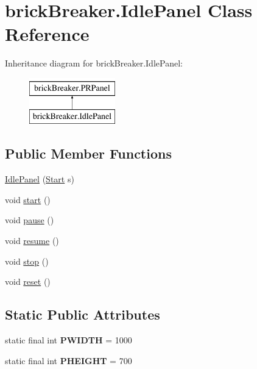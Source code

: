 \hypertarget{classbrick_breaker_1_1_idle_panel}{
\section{brickBreaker.IdlePanel Class Reference}
\label{classbrick_breaker_1_1_idle_panel}
}
Inheritance diagram for brickBreaker.IdlePanel:\begin{figure}[H]
\begin{center}
\leavevmode
\includegraphics[height=2cm]{classbrick_breaker_1_1_idle_panel}
\end{center}
\end{figure}
\subsection*{Public Member Functions}
\begin{DoxyCompactItemize}
\item 
\hyperlink{classbrick_breaker_1_1_idle_panel_ab4ba4ca56923da71a415ca965a07b0dd}{IdlePanel} (\hyperlink{classbrick_breaker_1_1_start}{Start} s)
\item 
void \hyperlink{classbrick_breaker_1_1_idle_panel_ad391091a78283ca2546e52f967d46ed6}{start} ()
\item 
void \hyperlink{classbrick_breaker_1_1_idle_panel_a42b96627662408932245a672b5fbfaf1}{pause} ()
\item 
void \hyperlink{classbrick_breaker_1_1_idle_panel_ab04b565d2e626077051cefb27772a98f}{resume} ()
\item 
void \hyperlink{classbrick_breaker_1_1_idle_panel_a2334ae977477929eeb82dbba53384360}{stop} ()
\item 
void \hyperlink{classbrick_breaker_1_1_idle_panel_a6d0829251befbc226224838015e9e46d}{reset} ()
\end{DoxyCompactItemize}
\subsection*{Static Public Attributes}
\begin{DoxyCompactItemize}
\item 
\hypertarget{classbrick_breaker_1_1_idle_panel_a58f042f33a11a790b7e7faee8482735f}{
static final int {\bfseries PWIDTH} = 1000}
\label{classbrick_breaker_1_1_idle_panel_a58f042f33a11a790b7e7faee8482735f}

\item 
\hypertarget{classbrick_breaker_1_1_idle_panel_a7ef3a9bc791cbdf50cbb54f10cb80608}{
static final int {\bfseries PHEIGHT} = 700}
\label{classbrick_breaker_1_1_idle_panel_a7ef3a9bc791cbdf50cbb54f10cb80608}

\end{DoxyCompactItemize}


